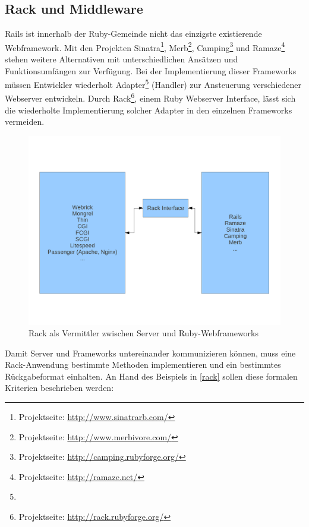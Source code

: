 \subsection{Rack und Middleware}
\label{grundrack}
Rails ist innerhalb der Ruby-Gemeinde nicht das einzigste existierende Webframework. Mit den Projekten Sinatra\footnote{Projektseite: \href{http://www.sinatrarb.com/}{http://www.sinatrarb.com/}}, Merb\footnote{Projektseite: \href{http://www.merbivore.com/}{http://www.merbivore.com/}}, Camping\footnote{Projektseite: \href{http://camping.rubyforge.org/}{http://camping.rubyforge.org/}} und Ramaze\footnote{Projektseite: \href{http://ramaze.net/}{http://ramaze.net/}} stehen weitere Alternativen mit unterschiedlichen Ansätzen und Funktionsumfängen zur Verfügung.
Bei der Implementierung dieser Frameworks müssen Entwickler wiederholt Adapter\footnote{} (Handler) zur Ansteuerung verschiedener Webserver entwickeln. Durch Rack\footnote{Projektseite: \href{http://rack.rubyforge.org/}{http://rack.rubyforge.org/}}, einem Ruby Webserver Interface, lässt sich die wiederholte Implementierung solcher Adapter in den einzelnen Frameworks vermeiden.
\begin{figure}[!h]
\begin{center}
\includegraphics[scale=0.6]{images/rack/rack.pdf}
\caption{Rack als Vermittler zwischen Server und Ruby-Webframeworks}
\label{rackschema}
\end{center}
\end{figure}


Damit Server und Frameworks untereinander kommunizieren können, muss eine Rack-Anwendung bestimmte Methoden implementieren und ein bestimmtes Rückgabeformat einhalten. An Hand des Beispiels in \ref{rack} sollen diese formalen Kriterien beschrieben werden:


